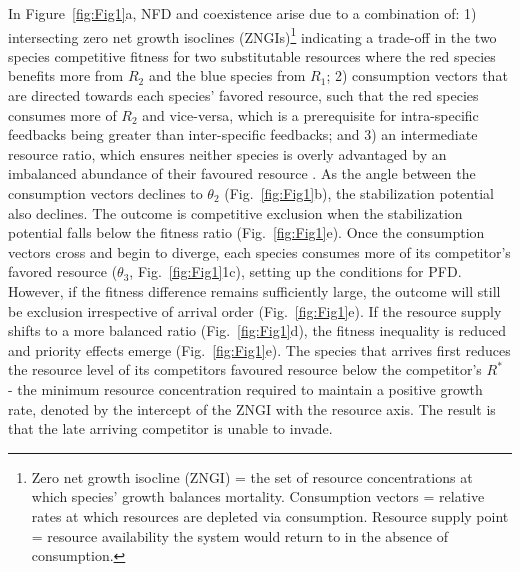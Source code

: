 \noindent In Figure~\ref{fig:Fig1}a, NFD and coexistence arise due to a combination of: 1) intersecting zero net growth isoclines (ZNGIs)\footnote{Zero net growth isocline (ZNGI) = the set of resource concentrations at which species' growth balances mortality. Consumption vectors = relative rates at which resources are depleted via consumption. Resource supply point = resource availability the system would return to in the absence of consumption.} indicating a trade-off in the two species competitive fitness for two substitutable resources where the red species benefits more from $R_{2}$ and the blue species from $R_{1}$; 2) consumption vectors that are directed towards each species' favored resource, such that the red species consumes more of $R_{2}$ and vice-versa, which is a prerequisite for intra-specific feedbacks being greater than inter-specific feedbacks; and 3) an intermediate resource ratio, which ensures neither species is overly advantaged by an imbalanced abundance of their favoured resource \citep{Chase2003, Letten2017}. As the angle between the consumption vectors declines to $\theta_{2}$ (Fig.~\ref{fig:Fig1}b), the stabilization potential also declines. The outcome is competitive exclusion when the stabilization potential falls below the fitness ratio (Fig.~\ref{fig:Fig1}e). Once the consumption vectors cross and begin to diverge, each species consumes more of its competitor's favored resource ($\theta_{3}$, Fig.~\ref{fig:Fig1}1c), setting up the conditions for PFD. However, if the fitness difference remains sufficiently large, the outcome will still be exclusion irrespective of arrival order (Fig.~\ref{fig:Fig1}e). If the resource supply shifts to a more balanced ratio (Fig.~\ref{fig:Fig1}d), the fitness inequality is reduced and priority effects emerge (Fig.~\ref{fig:Fig1}e). The species that arrives first reduces the resource level of its competitors favoured resource below the competitor's $R^*$ - the minimum resource concentration required to maintain a positive growth rate, denoted by the intercept of the ZNGI with the resource axis. The result is that the late arriving competitor is unable to invade. 
\par


